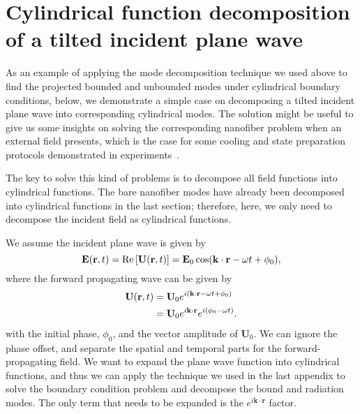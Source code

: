 \chapter{Cylindrical function decomposition of a tilted incident plane wave}\label{Ch:PlanewaveDecomposition}
As an example of applying the mode decomposition technique we used above to find the projected bounded and unbounded modes under cylindrical boundary conditions, below, we demonstrate a simple case on decomposing a tilted incident plane wave into corresponding cylindrical modes. The solution might be useful to give us some insights on solving the corresponding nanofiber problem when an external field presents, which is the case for some cooling and state preparation protocols demonstrated in experiments~\cite{Meng2017ground,Ostfeldt2017Dipole}. 

The key to solve this kind of problems is to decompose all field functions into cylindrical functions. The bare nanofiber modes have already been decomposed into cylindrical functions in the last section; therefore, here, we only need to decompose the incident field as cylindrical functions. 

We assume the incident plane wave is given by
\begin{equation}
\mathbf{E}(\mathbf{r},t)=\operatorname{Re}\left[\mathbf{U}(\mathbf{r},t) \right]=\mathbf{E}_0 \cos (\mathbf{k}\cdot\mathbf{r}-\omega t + \phi_0),
\end{equation}
where the forward propagating wave can be given by
\begin{align}
\mathbf{U}(\mathbf{r},t) &= \mathbf{U}_0e^{i(\mathbf{k}\cdot\mathbf{r}-\omega t + \phi_0)}\\
&= \mathbf{U}_0e^{i\mathbf{k}\cdot\mathbf{r}}e^{i(\phi_0-\omega t )}.
\end{align}
with the initial phase, $\phi_0$, and the vector amplitude of $\mathbf{U}_0$. We can ignore the phase offset, and separate the spatial and temporal parts for the forward-propagating field. We want to expand the plane wave function into cylindrical functions, and thus we can apply the technique we used in the last appendix to solve the boundary condition problem and decompose the bound and radiation modes. The only term that needs to be expanded is the $ e^{i\mathbf{k}\cdot\mathbf{r}} $ factor. 

